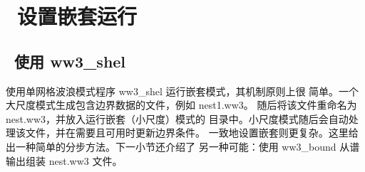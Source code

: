 \pagestyle{myheadings} \setcounter{page}{1} \setcounter{footnote}{0}

\section{~设置嵌套运行} \label{app:nest}
\newcounters
\vssub
\subsection{~使用 {\file ww3\_shel}}
\vssub

使用单网格波浪模式程序 {\file ww3\_shel} 运行嵌套模式，其机制原则上很
简单。一个大尺度模式生成包含边界数据的文件，例如 {\file nest1.ww3}。
随后将该文件重命名为 {\file nest.ww3}，并放入运行嵌套（小尺度）模式的
目录中。小尺度模式随后会自动处理该文件，并在需要且可用时更新边界条件。
一致地设置嵌套则更复杂。这里给出一种简单的分步方法。下一小节还介绍了
另一种可能：使用 {\code ww3\_bound} 从谱输出组装 {\file nest.ww3} 文件。


